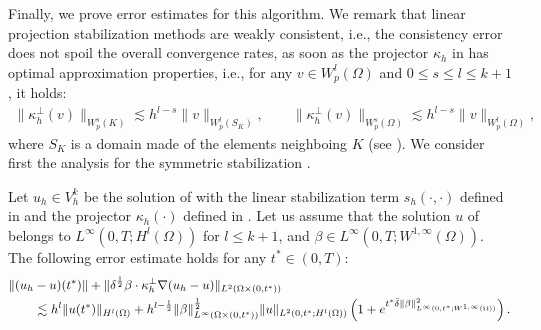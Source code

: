 Finally, we prove error estimates for this algorithm. We remark that linear projection stabilization methods are weakly consistent, i.e., the consistency error does not spoil the overall convergence rates, as soon as the projector $\kappa_h$ in  has optimal approximation properties, i.e., for any $v\in W^l_p(\Omega)$ and $0\leq s \leq l \leq k+1$, it holds:
\begin{align}\label{eq-orthapprox}
\|\kappa_h^\perp(v)\|_{W^s_p(K)} \lesssim h^{l-s} \|v\|_{W^l_p(S_K)}, \qquad 
\|\kappa_h^\perp(v)\|_{W^s_p(\Omega)} \lesssim h^{l-s} \|v\|_{W_p^l(\Omega)},
\end{align}
where $S_K$ is a domain made of the elements neighboing $K$ (see \cite{brenner_mathematical_2010}).  We consider first the analysis for the  symmetric stabilization .
\begin{theorem}[Convergence]\label{th:conv}
Let $u_h \in V_h^k$ be the solution of  with the linear stabilization term $s_h(\cdot,\cdot)$ defined in    and the projector $\kappa_h(\cdot)$ defined in . Let us assume that the solution $u$ of  belongs to $L^\infty(0,T;H^l(\Omega))$ for $l \leq k+1$, and $\beta\in L^\infty(0,T;W^{1,\infty}(\Omega))$. The following error estimate holds for any $t^* \in (0,T)$:
\begin{align*}
& \|(u_h-u)(t^*)\| + \| \delta^\frac{1}{2} \beta \cdot \kappa_h^\perp \nabla  (u_h-u) \|_{L^2(\Omega \times (0,t^*))}   \\
& \qquad \lesssim 
  h^{l} \|u(t^*)\|_{H^l(\Omega)}  +  h^{l-\frac{1}{2}}\|\beta\|_{L^{\infty}(\Omega \times (0,t^*))}^{\frac{1}{2}} \|u\|_{L^2(0,t^*;H^l(\Omega))} \left( 1 + e^{t^* {\bar \delta } \|\beta  \|^2_{L^\infty(0,t^*;W^{1,\infty}(\Omega))}}
\right). 
\end{align*}
\end{theorem}

